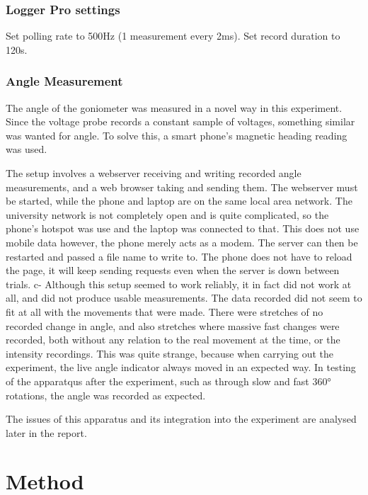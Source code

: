 \subsubsection*{Logger Pro settings}
Set polling rate to 500Hz (1 measurement every 2ms). Set record duration to 120s.

\subsubsection*{Angle Measurement}

The angle of the goniometer was measured in a novel way in this experiment. Since the voltage probe records a constant sample of voltages, something similar was wanted for angle. To solve this, a smart phone's magnetic heading reading was used.

The setup involves a webserver receiving and writing recorded angle measurements, and a web browser taking and sending them. The webserver must be started, while the phone and laptop are on the same local area network. The university network is not completely open and is quite complicated, so the phone's hotspot was use and the laptop was connected to that. This does not use mobile data however, the phone merely acts as a modem. The server can then be restarted and passed a file name to write to. The phone does not have to reload the page, it will keep sending requests even when the server is down between trials. c-
Although this setup seemed to work reliably, it in fact did not work at all, and did not produce usable measurements. The data recorded did not seem to fit at all with the movements that were made. There were stretches of no recorded change in angle, and also stretches where massive fast changes were recorded, both without any relation to the real movement at the time, or the intensity recordings. This was quite strange, because when carrying out the experiment, the live angle indicator always moved in an expected way. In testing of the apparatqus after the experiment, such as through slow and fast 360° rotations, the angle was recorded as expected.

The issues of this apparatus and its integration into the experiment are analysed later in the report.

\section*{Method}

